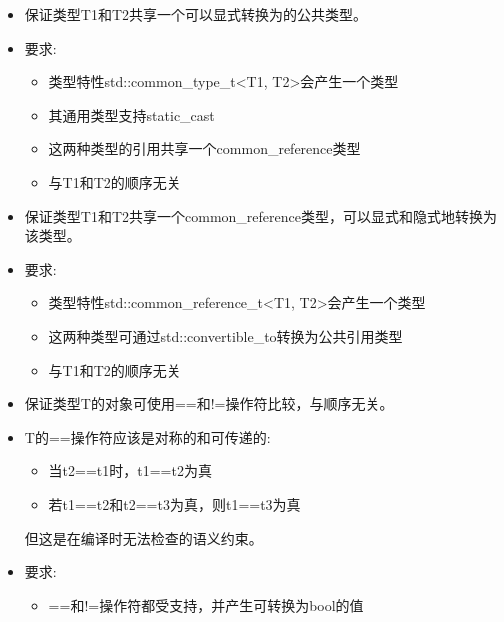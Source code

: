 \begin{itemize}
\item
保证类型T1和T2共享一个可以显式转换为的公共类型。

\item
要求:
\begin{itemize}
\item
类型特性std::common\_type\_t<T1, T2>会产生一个类型

\item
其通用类型支持static\_cast

\item
这两种类型的引用共享一个common\_reference类型

\item
与T1和T2的顺序无关
\end{itemize}
\end{itemize}


\begin{itemize}
\item
保证类型T1和T2共享一个common\_reference类型，可以显式和隐式地转换为该类型。

\item
要求:
\begin{itemize}
\item
类型特性std::common\_reference\_t<T1, T2>会产生一个类型

\item
这两种类型可通过std::convertible\_to转换为公共引用类型

\item
与T1和T2的顺序无关
\end{itemize}
\end{itemize}



\begin{itemize}
\item
保证类型T的对象可使用==和!=操作符比较，与顺序无关。

\item
T的==操作符应该是对称的和可传递的:
\begin{itemize}
\item
当t2==t1时，t1==t2为真

\item
若t1==t2和t2==t3为真，则t1==t3为真
\end{itemize}

但这是在编译时无法检查的语义约束。

\item
要求:
\begin{itemize}
\item
==和!=操作符都受支持，并产生可转换为bool的值
\end{itemize}
\end{itemize}

